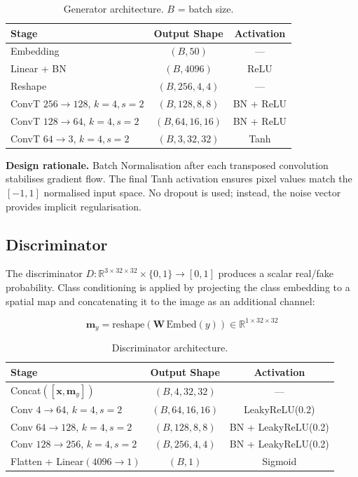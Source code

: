 \documentclass[conference]{IEEEtran}
\begin{document}
\begin{table}[h]
  \centering
  \caption{Generator architecture. $B$ = batch size.}
  \label{tab:gen_arch}
  \begin{tabular}{lcc}
    \toprule
    \textbf{Stage} & \textbf{Output Shape} & \textbf{Activation} \\
    \midrule
    Embedding & $(B, 50)$ & --- \\
    Linear + BN & $(B, 4096)$ & ReLU \\
    Reshape & $(B, 256, 4, 4)$ & --- \\
    ConvT $256\!\to\!128$, $k{=}4, s{=}2$ & $(B, 128, 8, 8)$ & BN + ReLU \\
    ConvT $128\!\to\!64$, $k{=}4, s{=}2$ & $(B, 64, 16, 16)$ & BN + ReLU \\
    ConvT $64\!\to\!3$, $k{=}4, s{=}2$ & $(B, 3, 32, 32)$ & Tanh \\
    \bottomrule
  \end{tabular}
\end{table}

\textbf{Design rationale.} Batch Normalisation after each transposed convolution stabilises gradient flow. The final Tanh activation ensures pixel values match the $[-1, 1]$ normalised input space. No dropout is used; instead, the noise vector provides implicit regularisation.

\subsection{Discriminator}
\label{ssec:disc}

The discriminator $D: \mathbb{R}^{3 \times 32 \times 32} \times \{0,1\} \rightarrow [0,1]$ produces a scalar real/fake probability. Class conditioning is applied by projecting the class embedding to a spatial map and concatenating it to the image as an additional channel:

\begin{equation}
  \mathbf{m}_y = \text{reshape}\!\left(\mathbf{W}\,\text{Embed}(y)\right) \in \mathbb{R}^{1 \times 32 \times 32}
  \label{eq:embed_d}
\end{equation}

\begin{table}[h]
  \centering
  \caption{Discriminator architecture.}
  \label{tab:disc_arch}
  \begin{tabular}{lcc}
    \toprule
    \textbf{Stage} & \textbf{Output Shape} & \textbf{Activation} \\
    \midrule
    Concat$([\mathbf{x}, \mathbf{m}_y])$ & $(B, 4, 32, 32)$ & --- \\
    Conv $4\!\to\!64$, $k{=}4, s{=}2$ & $(B, 64, 16, 16)$ & LeakyReLU(0.2) \\
    Conv $64\!\to\!128$, $k{=}4, s{=}2$ & $(B, 128, 8, 8)$ & BN + LeakyReLU(0.2) \\
    Conv $128\!\to\!256$, $k{=}4, s{=}2$ & $(B, 256, 4, 4)$ & BN + LeakyReLU(0.2) \\
    Flatten + Linear$(4096 \to 1)$ & $(B, 1)$ & Sigmoid \\
    \bottomrule
  \end{tabular}
\end{table}
\end{document}
